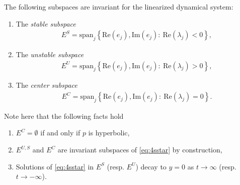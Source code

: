 \begin{definition}
The following subspaces are invariant for the linearized dynamical system:
\begin{enumerate}
	\item The \emph{stable subspace}
		\begin{align}
			\boxed{
				E^{S} =  \textrm{span} _{j}\left \{  \textrm{Re} (e_j),  \textrm{Im} (e_j):\  \textrm{Re} (\lambda_j) < 0\right\},
			}
		\end{align}
	\item The \emph{unstable subspace}
		\begin{align}
			\boxed{
				E^{U} =  \textrm{span} _{j}\left \{  \textrm{Re} (e_j),  \textrm{Im} (e_j):\  \textrm{Re} (\lambda_j) > 0\right\},
			}
		\end{align}
	\item The \emph{center subspace}
		\begin{align}
			\boxed{
				E^{C} =  \textrm{span} _{j}\left \{  \textrm{Re} (e_j),  \textrm{Im} (e_j):\  \textrm{Re} (\lambda_j) = 0\right\}.
			}
		\end{align}
\end{enumerate}

\end{definition}
\begin{remark}[]
	Note here that the following facts hold
	\begin{enumerate}
		\item $E^{C}= \emptyset$ if and only if $p$ is hyperbolic,
		\item $E^{U,S}$ and $E^{C}$ are invariant subspaces of \eqref{eq:4sstar} by construction,
		\item Solutions of \eqref{eq:4sstar} in $E^{S}$ (resp. $E^{U}$) decay to $y=0$ as $t \to \infty$ (resp. $t \to - \infty$). 
	\end{enumerate}
	
\end{remark}

